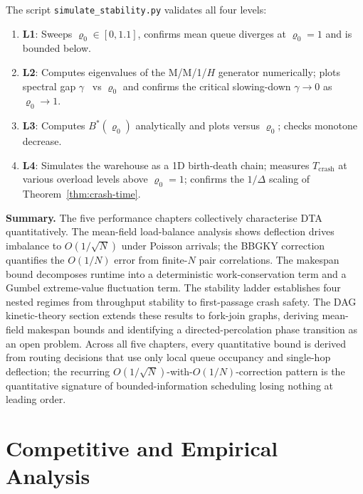 \documentclass[11pt,a4paper]{article}
\newcommand{\partbreak}{\clearpage\phantomsection}
\newcommand{\rhozero}{\varrho_0}
\begin{document}
The script \texttt{simulate\_stability.py} validates all four levels:
\begin{enumerate}
  \item \textbf{L1}: Sweeps $\rhozero \in [0, 1.1]$, confirms mean queue
        diverges at $\rhozero = 1$ and is bounded below.
  \item \textbf{L2}: Computes eigenvalues of the M/M/1/$H$ generator
        numerically; plots spectral gap $\gamma$~\cite{diaconis_stroock1991,fill1991} vs $\rhozero$ and
        confirms the critical slowing-down $\gamma \to 0$ as $\rhozero \to 1$.
  \item \textbf{L3}: Computes $B^*(\rhozero)$ analytically and plots
        versus $\rhozero$; checks monotone decrease.
  \item \textbf{L4}: Simulates the warehouse as a 1D birth-death chain;
        measures $T_{\mathrm{crash}}$ at various overload levels above $\rhozero = 1$;
        confirms the $1/\Delta$ scaling of Theorem~\ref{thm:crash-time}.
\end{enumerate}
\endgroup

\bigskip
\noindent\textbf{Summary.}
The five performance chapters collectively characterise DTA quantitatively.
The mean-field load-balance analysis shows deflection drives imbalance to
$O(1/\sqrt{N})$ under Poisson arrivals; the BBGKY correction quantifies
the $O(1/N)$ error from finite-$N$ pair correlations.
The makespan bound decomposes runtime into a deterministic work-conservation
term and a Gumbel extreme-value fluctuation term.
The stability ladder establishes four nested regimes from throughput
stability to first-passage crash safety.
The DAG kinetic-theory section extends these results to fork-join graphs,
deriving mean-field makespan bounds and identifying a directed-percolation
phase transition as an open problem.
Across all five chapters, every quantitative bound is derived from
routing decisions that use only local queue occupancy and single-hop
deflection; the recurring $O(1/\sqrt{N})$-with-$O(1/N)$-correction
pattern is the quantitative signature of bounded-information scheduling
losing nothing at leading order.

\partbreak
\part{Competitive and Empirical Analysis}
\end{document}
